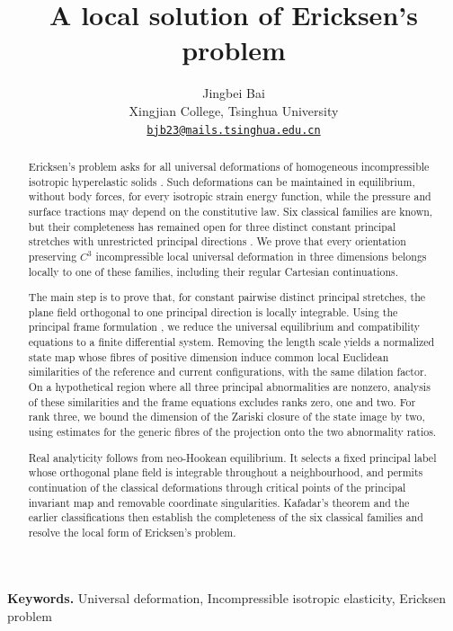 \documentclass[11pt,a4paper]{article}
\newcommand{\keywords}[1]{\par\smallskip\noindent\textbf{Keywords.} #1\par}
\numberwithin{equation}{section}
\theoremstyle{plain}
\theoremstyle{definition}
\theoremstyle{remark}
\begin{document}
\title{A local solution of Ericksen's problem}
\author{Jingbei Bai\\
{\small Xingjian College, Tsinghua University}\\
{\small\href{mailto:bjb23@mails.tsinghua.edu.cn}{\texttt{bjb23@mails.tsinghua.edu.cn}}}}
\date{}
\maketitle
\begin{abstract}
Ericksen's problem asks for all universal deformations of homogeneous
incompressible isotropic hyperelastic solids \cite{Ericksen1954}.
Such deformations can be maintained in equilibrium, without body forces,
for every isotropic strain energy function, while the pressure and surface
tractions may depend on the constitutive law. Six classical families are
known, but their completeness has remained open for three distinct
constant principal stretches with unrestricted principal directions
\cite{YavariGoriely2023,Yavari2026Residual}. We prove that every orientation
preserving $C^3$ incompressible local universal deformation in three
dimensions belongs locally to one of these families, including their
regular Cartesian continuations.

The main step is to prove that, for constant pairwise distinct principal
stretches, the plane field orthogonal to one principal direction is locally
integrable. Using the principal frame
formulation \cite{Marris1975,Marris1982}, we reduce the universal equilibrium
and compatibility equations to a finite differential system. Removing the
length scale yields a normalized state map whose fibres of positive
dimension induce common local Euclidean similarities of the reference and
current configurations, with the same dilation factor. On a hypothetical
region where all three principal abnormalities are nonzero, analysis of
these similarities and the frame equations excludes ranks zero, one and
two. For rank three, we bound the dimension of the Zariski closure of the
state image by two, using estimates for the generic fibres of the
projection onto the two abnormality ratios.

Real analyticity follows from neo-Hookean equilibrium. It selects a fixed
principal label whose orthogonal plane field is integrable throughout a
neighbourhood, and permits continuation of the classical deformations
through critical points of the principal invariant map and removable
coordinate singularities. Kafadar's theorem \cite{Kafadar1972} and the
earlier classifications
\cite{MarrisShiau1970,MarrisShiauCorr1970,MartinCarlson1976} then establish
the completeness of the six classical families and resolve the local form
of Ericksen's problem.
\end{abstract}
\keywords{Universal deformation, Incompressible isotropic elasticity, Ericksen problem}
\clearpage
\tableofcontents
\clearpage
\end{document}
